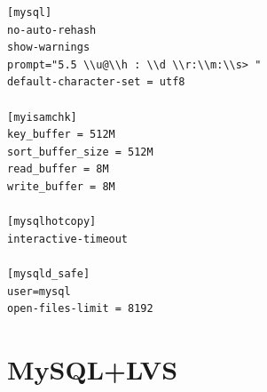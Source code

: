 \begin{verbatim}
[mysql]
no-auto-rehash
show-warnings
prompt="5.5 \\u@\\h : \\d \\r:\\m:\\s> "
default-character-set = utf8

[myisamchk]
key_buffer = 512M
sort_buffer_size = 512M
read_buffer = 8M
write_buffer = 8M

[mysqlhotcopy]
interactive-timeout

[mysqld_safe]
user=mysql
open-files-limit = 8192
\end{verbatim}

\chapter{MySQL+LVS}
